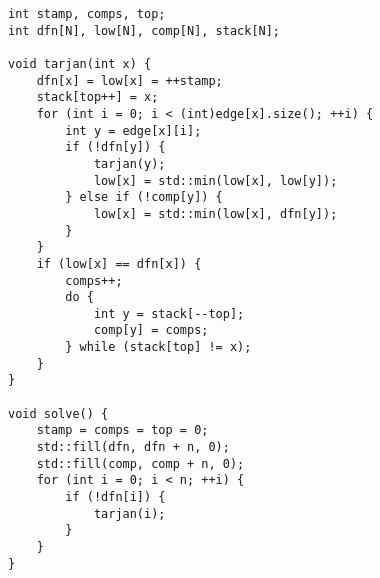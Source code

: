 \begin{lstlisting}
int stamp, comps, top;
int dfn[N], low[N], comp[N], stack[N];

void tarjan(int x) {
    dfn[x] = low[x] = ++stamp;
    stack[top++] = x;
    for (int i = 0; i < (int)edge[x].size(); ++i) {
        int y = edge[x][i];
        if (!dfn[y]) {
            tarjan(y);
            low[x] = std::min(low[x], low[y]);
        } else if (!comp[y]) {
            low[x] = std::min(low[x], dfn[y]);
        }
    }
    if (low[x] == dfn[x]) {
        comps++;
        do {
            int y = stack[--top];
            comp[y] = comps;
        } while (stack[top] != x);
    }
}

void solve() {
    stamp = comps = top = 0;
    std::fill(dfn, dfn + n, 0);
    std::fill(comp, comp + n, 0);
    for (int i = 0; i < n; ++i) {
        if (!dfn[i]) {
            tarjan(i);
        }
    }
}
\end{lstlisting}
